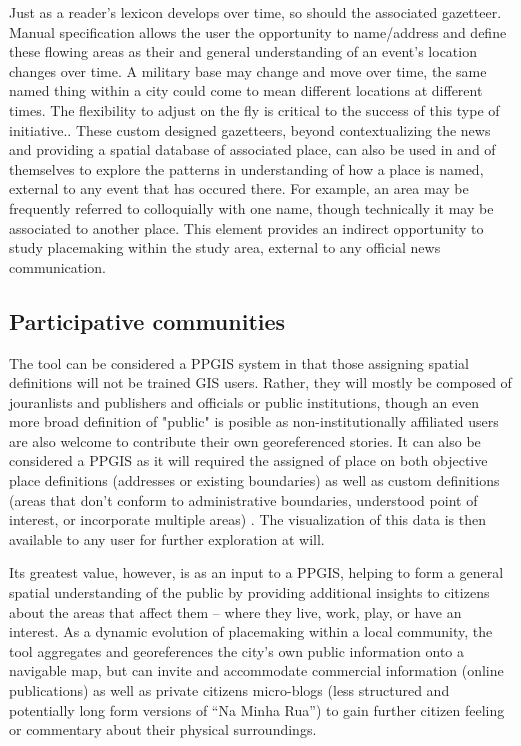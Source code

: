 Just as a reader’s lexicon develops over time, so should the associated gazetteer.  Manual specification allows the user the opportunity to name/address and define these flowing areas as their and general understanding of an event’s location changes over time. A military base may change and move over time, the same named thing within a city could come to mean different locations at different times. The flexibility to adjust on the fly is critical to the success of this type of initiative.\cite{Lieberman2010}.  These custom designed gazetteers, beyond contextualizing the news and providing a spatial database of associated place, can also be used in and of themselves to explore the patterns in understanding of how a place is named, external to any event that has occured there. For example, an area may be frequently referred to colloquially with one name, though technically it may be associated to another place. This element provides an indirect opportunity to study placemaking within the study area, external to any official news communication.

\subsection{Participative communities}
The tool can be considered a PPGIS system in that those assigning spatial definitions will not be trained GIS users. Rather, they will mostly be composed of jouranlists and publishers and officials or public institutions, though an even more broad definition of "public" is posible as non-institutionally affiliated users are also welcome to contribute their own georeferenced stories.  It can also be considered a PPGIS as it will required the assigned of place on both objective place definitions (addresses or existing boundaries) as well as custom definitions (areas that don't conform to administrative boundaries, understood point of interest, or incorporate multiple areas) \cite{Brown2012}. The visualization of this data is then available to any user for further exploration at will. %

Its greatest value, however, is as an input to a PPGIS, helping to form a general spatial understanding of the public by providing additional insights to citizens about the areas that affect them -- where they live, work, play, or have an interest. %
As a dynamic evolution of placemaking within a local community, the tool aggregates and georeferences the city’s own public information onto a navigable map, but can invite and accommodate commercial information (online publications) as well as private citizens micro-blogs (less structured and potentially long form versions of “Na Minha Rua”) to gain further citizen feeling or commentary about their physical surroundings. %

